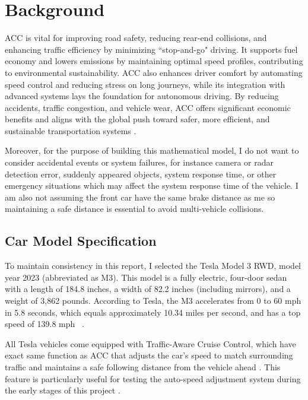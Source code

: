 \documentclass[12pt]{article}
\begin{document}
\section*{Background}
ACC is vital for improving road safety, reducing rear-end collisions, and enhancing traffic efficiency by minimizing ``stop-and-go" driving. It supports fuel economy and lowers emissions by maintaining optimal speed profiles, contributing to environmental sustainability. ACC also enhances driver comfort by automating speed control and reducing stress on long journeys, while its integration with advanced systems lays the foundation for autonomous driving. By reducing accidents, traffic congestion, and vehicle wear, ACC offers significant economic benefits and aligns with the global push toward safer, more efficient, and sustainable transportation systems \cite{kbb_adaptive_cruise_control}.

Moreover, for the purpose of building this mathematical model, I do not want to consider accidental events or system failures, for instance camera or radar detection error, suddenly appeared objects, system response time, or other emergency situations which may affect the system response time of the vehicle. I am also not assuming the front car have the same brake distance as me so maintaining a safe distance is essential to avoid multi-vehicle collisions.

\subsection*{Car Model Specification}

\indent To maintain consistency in this report, I selected the Tesla Model 3 RWD, model year 2023 (abbreviated as M3). This model is a fully electric, four-door sedan with a length of 184.8 inches, a width of 82.2 inches (including mirrors), and a weight of 3,862 pounds. According to Tesla, the M3 accelerates from 0 to 60 mph in 5.8 seconds, which equals approximately 10.34 miles per second, and has a top speed of 139.8 mph ~\cite{tesla_m3_evspecs}.

All Tesla vehicles come equipped with Traffic-Aware Cruise Control, which have exact same function as ACC that adjusts the car's speed to match surrounding traffic and maintains a safe following distance from the vehicle ahead \cite{kbb_adaptive_cruise_control}. This feature is particularly useful for testing the auto-speed adjustment system during the early stages of this project \cite{tesla_model3_manual}. 
\end{document}
